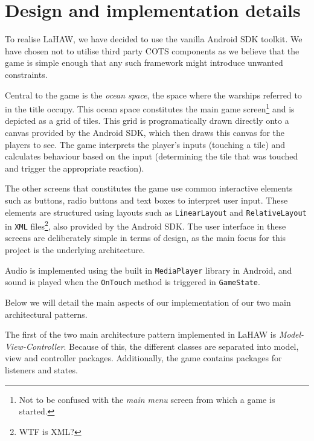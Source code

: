




\chapter{Design and implementation details}
\label{cha:design_details}

To realise LaHAW, we have decided to use the vanilla Android SDK toolkit. We have chosen not to utilise third party COTS components as we believe that the game is simple enough that any such framework might introduce unwanted constraints.

Central to the game is the \emph{ocean space}, the space where the warships referred to in the title occupy. This ocean space constitutes the main game screen\footnote{Not to be confused with the \emph{main menu} screen from which a game is started.} and is depicted as a grid of tiles.
This grid is programatically drawn directly onto a canvas provided by the Android SDK, which then draws this canvas for the players to see. The game interprets the player's inputs (touching a tile) and calculates behaviour based on the input (determining the tile that was touched and trigger the appropriate reaction).

The other screens that constitutes the game use common interactive elements such as buttons, radio buttons and text boxes to interpret user input. These elements are structured using layouts such as \texttt{LinearLayout} and \texttt{RelativeLayout} in \texttt{XML} files\footnote{WTF is XML?}, also provided by the Android SDK. The user interface in these screens are deliberately simple in terms of design, as the main focus for this project is the underlying architecture.

Audio is implemented using the built in \texttt{MediaPlayer} library in Android, and sound is played when the \texttt{OnTouch} method is triggered in \texttt{GameState}.


Below we will detail the main aspects of our implementation of our two main architectural patterns.

The first of the two main architecture pattern implemented in LaHAW is \emph{Model-View-Controller}. Because of this, the different classes are separated into model, view and controller packages. Additionally, the game contains packages for listeners and states.

